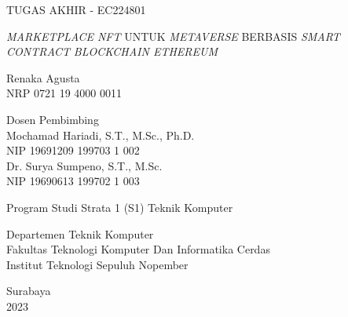 \begin{large}
  TUGAS AKHIR - EC224801
\end{large}

\vspace{\fill}

\begin{spacing}{1.5}
  \begin{Large}
    \emph{MARKETPLACE NFT} UNTUK \emph{METAVERSE} BERBASIS \emph{SMART CONTRACT} \emph{BLOCKCHAIN ETHEREUM}
  \end{Large}
\end{spacing} 

\vspace{\fill}

\begin{large}
  Renaka Agusta \\
  \textnormal{NRP 0721 19 4000 0011}
\end{large}

\vspace{\fill}

\begin{large}
  \textnormal{Dosen Pembimbing} \\
  Mochamad Hariadi, S.T., M.Sc., Ph.D. \\
  \textnormal{NIP 19691209 199703 1 002} \\
  Dr. Surya Sumpeno, S.T., M.Sc. \\
  \textnormal{NIP 19690613 199702 1 003}
\end{large}

\vspace{\fill}

Program Studi Strata 1 (S1) Teknik Komputer \\

\normalfont

Departemen Teknik Komputer \\
Fakultas Teknologi Komputer Dan Informatika Cerdas \\
Institut Teknologi Sepuluh Nopember

Surabaya \\
2023
